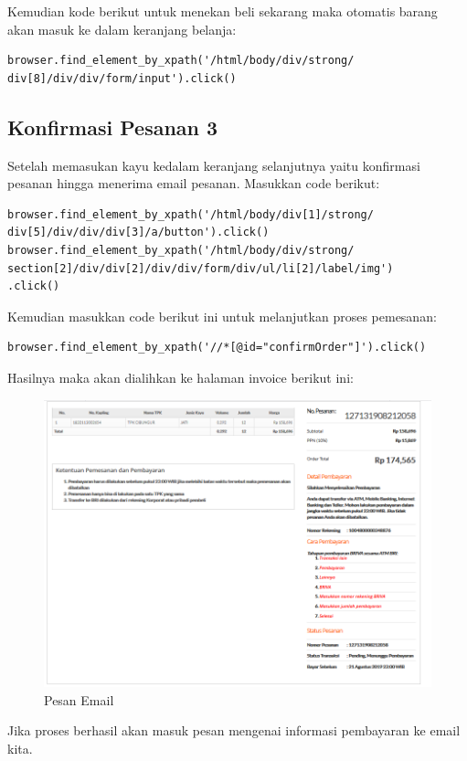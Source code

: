 Kemudian kode berikut untuk menekan beli sekarang maka otomatis barang akan masuk ke dalam keranjang belanja:
\begin{verbatim}
browser.find_element_by_xpath('/html/body/div/strong/
div[8]/div/div/form/input').click()
\end{verbatim}

\newpage
\subsection{Konfirmasi Pesanan 3}
Setelah memasukan kayu kedalam keranjang selanjutnya yaitu konfirmasi pesanan hingga menerima email pesanan. 
Masukkan code berikut:
\begin{verbatim}
browser.find_element_by_xpath('/html/body/div[1]/strong/
div[5]/div/div/div[3]/a/button').click()
browser.find_element_by_xpath('/html/body/div/strong/
section[2]/div/div[2]/div/div/form/div/ul/li[2]/label/img')
.click()
\end{verbatim}

Kemudian masukkan code berikut ini untuk melanjutkan proses pemesanan:
\begin{verbatim}
browser.find_element_by_xpath('//*[@id="confirmOrder"]').click()
\end{verbatim}

Hasilnya maka akan dialihkan ke halaman invoice berikut ini:
\begin{figure}[h]
	\centering
	\includegraphics[scale=0.30]{figures/6invoice}
	\caption{Pesan Email}
\end{figure}

Jika proses berhasil akan masuk pesan mengenai informasi pembayaran ke email kita.

